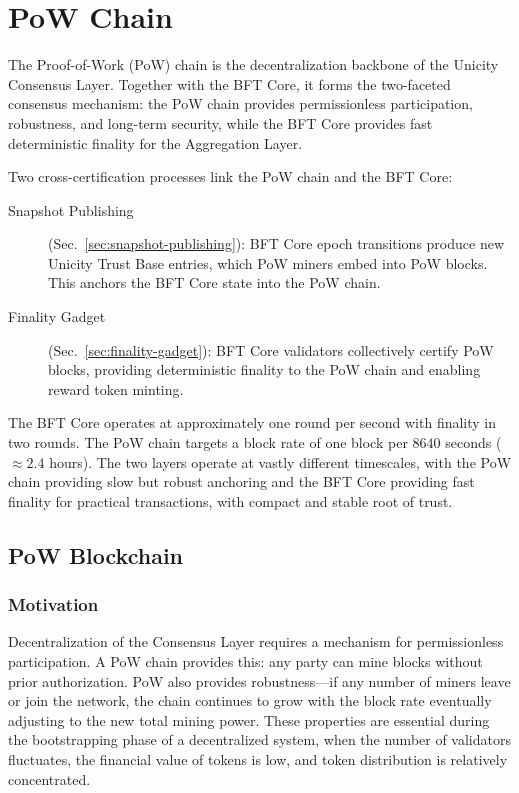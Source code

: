 \chapter{PoW Chain}\label{ch:pow-chain}

The Proof-of-Work (PoW) chain is the decentralization backbone of the Unicity Consensus Layer. Together with the BFT Core, it forms the two-faceted consensus mechanism: the PoW chain provides permissionless participation, robustness, and long-term security, while the BFT Core provides fast deterministic finality for the Aggregation Layer.

Two cross-certification processes link the PoW chain and the BFT Core:
\begin{description}
\item[Snapshot Publishing] (Sec.~\ref{sec:snapshot-publishing}): BFT Core epoch transitions produce new Unicity Trust Base entries, which PoW miners embed into PoW blocks. This anchors the BFT Core state into the PoW chain.
\item[Finality Gadget] (Sec.~\ref{sec:finality-gadget}): BFT Core validators collectively certify PoW blocks, providing deterministic finality to the PoW chain and enabling reward token minting.
\end{description}

The BFT Core operates at approximately one round per second with finality in two rounds. The PoW chain targets a block rate of one block per $8640$ seconds ($\approx 2.4$ hours). The two layers operate at vastly different timescales, with the PoW chain providing slow but robust anchoring and the BFT Core providing fast finality for practical transactions, with compact and stable root of trust.


\section{PoW Blockchain}\label{sec:pow-blockchain}

\subsection{Motivation}\label{sec:pow-motivation}

Decentralization of the Consensus Layer requires a mechanism for permissionless participation. A PoW chain provides this: any party can mine blocks without prior authorization. PoW also provides robustness---if any number of miners leave or join the network, the chain continues to grow with the block rate eventually adjusting to the new total mining power. These properties are essential during the bootstrapping phase of a decentralized system, when the number of validators fluctuates, the financial value of tokens is low, and token distribution is relatively concentrated.


